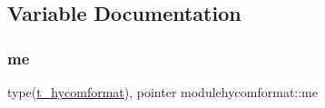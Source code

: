 \subsection{Variable Documentation}
\mbox{\label{namespacemodulehycomformat_aa2b991be0844db8ecd1a671df3bdf8f2}} 
\subsubsection{\texorpdfstring{me}{me}}
{\footnotesize\ttfamily type(\mbox{\hyperlink{structmodulehycomformat_1_1t__hycomformat}{t\+\_\+hycomformat}}), pointer modulehycomformat\+::me\hspace{0.3cm}{\ttfamily [private]}}

